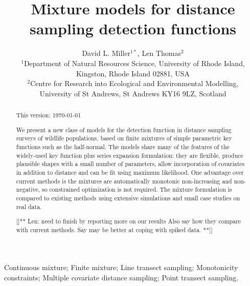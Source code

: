 \documentclass[useAMS,referee]{biom}
\title[Mixture model detection functions]{Mixture models for distance sampling detection functions}
\author{David L. Miller$^{1*}$\email{dave@ninepointeightone.net}, Len Thomas$^{2}$\\
$^{1}$Department of Natural Resources Science, University of Rhode Island,\\ 
Kingston, Rhode Island 02881, USA\\
$^{2}$Centre for Research into Ecological and Environmental Modelling,\\
University of St Andrews, St Andrews KY16 9LZ, Scotland}
\begin{document}



\label{firstpage}


\begin{abstract}
This version: \today %

We present a new class of models for the detection function in distance sampling surveys of wildlife populations, based on finite mixtures of simple parametric key functions such as the half-normal. The models share many of the features of the widely-used key function plus series expansion formulation: they are flexible, produce plausible shapes with a small number of parameters, allow incorporation of covariates in addition to distance and can be fit using maximum likelihood. One advantage over current methods is the mixtures are automatically monotonic non-increasing and non-negative, so constrained optimization is not required. The mixture formulation is compared to existing methods using extensive simulations and small case studies on real data. 

[[** Len: need to finish by reporting more on our results Also say how they compare with current methods.  Say may be better at coping with spiked data.  **]]
\end{abstract}

%

\begin{keywords}
Continuous mixture; Finite mixture; Line transect sampling; Monotonicity constraints; Multiple covariate distance sampling; Point transect sampling.
\end{keywords}
\end{document}
